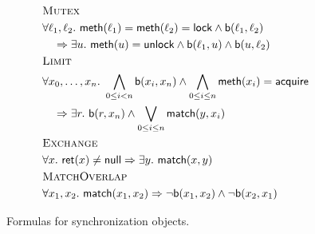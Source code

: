 \begin{figure}

  \footnotesize
  \begin{align*}
    & \textsc{Mutex} \\
    & \forall \ell_1, \ell_2.\ {\sf meth}(\ell_1) = {\sf meth}(\ell_2) = {\sf lock} \land {\sf b}(\ell_1,\ell_2) \\
    & \quad \implies \exists u.\ {\sf meth}(u) = {\sf unlock} \land {\sf b}(\ell_1,u) \land {\sf b}(u,\ell_2)
    \\
    & \textsc{Limit} \\
    & \forall x_0,\dots,x_n.\ \bigwedge_{0 \leq i < n} {\sf b}(x_i,x_n) \land \bigwedge_{0 \leq i \leq n} {\sf meth}(x_i) = {\sf acquire} \\
    & \quad \implies \exists r.\ {\sf b}(r,x_n) \land \bigvee_{0 \leq i \leq n} {\sf match}(y,x_i)
    \\
    & \textsc{Exchange} \\
    & \forall x.\ {\sf ret}(x) \neq {\sf null} \implies  \exists y.\ {\sf match}(x,y)  \\
    & \textsc{MatchOverlap} \\
    & \forall x_1,x_2.\ {\sf match}(x_1,x_2) \implies \neg {\sf b}(x_1,x_2) \land \neg {\sf b}(x_2,x_1) 
  \end{align*}

  \caption{Formulas for synchronization objects.}
  \label{fig:formulas:synchronization}

\end{figure}
